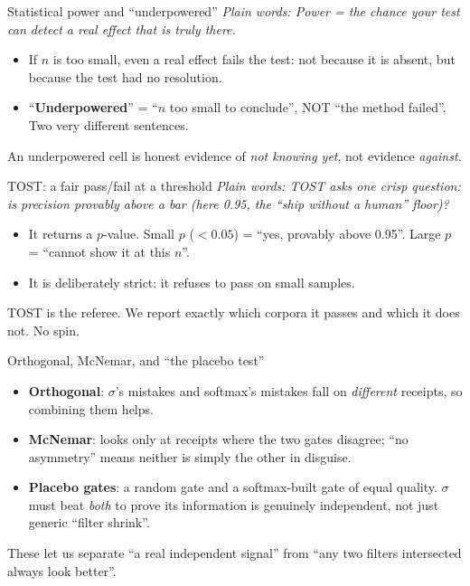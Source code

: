 \documentclass[aspectratio=169]{beamer}
\newcommand{\keybox}[1]{\begin{center}\colorbox{grey!15}{\parbox{0.92\linewidth}{\centering #1}}\end{center}}
\newcommand{\plain}[1]{\textit{\textcolor{sig}{Plain words:} #1}}
\begin{document}
\begin{frame}{Statistical power and ``underpowered''}
\plain{Power = the chance your test can \emph{detect} a real effect that
is truly there.}
\begin{itemize}
\item If $n$ is too small, even a real effect fails the test: not
because it is absent, but because the test had no resolution.
\item ``\textbf{Underpowered}'' = ``$n$ too small to conclude'', NOT
``the method failed''. Two very different sentences.
\end{itemize}
\keybox{An underpowered cell is honest evidence of \emph{not knowing
yet}, not evidence \emph{against}.}
\end{frame}

\begin{frame}{TOST: a fair pass/fail at a threshold}
\plain{TOST asks one crisp question: is precision provably above a bar
(here 0.95, the ``ship without a human'' floor)?}
\begin{itemize}
\item It returns a $p$-value. Small $p$ ($<0.05$) = ``yes, provably
above 0.95''. Large $p$ = ``cannot show it at this $n$''.
\item It is deliberately strict: it refuses to pass on small samples.
\end{itemize}
\keybox{TOST is the referee. We report exactly which corpora it passes
and which it does not. No spin.}
\end{frame}

\begin{frame}{Orthogonal, McNemar, and ``the placebo test''}
\begin{itemize}
\item \textbf{Orthogonal}: $\sigma$'s mistakes and softmax's mistakes
fall on \emph{different} receipts, so combining them helps.
\item \textbf{McNemar}: looks only at receipts where the two gates
disagree; ``no asymmetry'' means neither is simply the other in
disguise.
\item \textbf{Placebo gates}: a random gate and a softmax-built gate of
equal quality. $\sigma$ must beat \emph{both} to prove its information
is genuinely independent, not just generic ``filter shrink''.
\end{itemize}
\keybox{These let us separate ``a real independent signal'' from ``any
two filters intersected always look better''.}
\end{frame}
\end{document}
